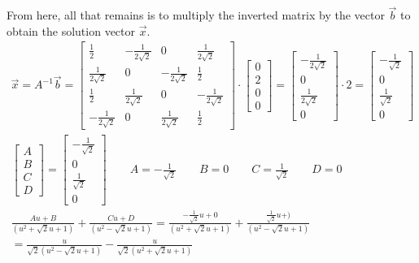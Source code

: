 \documentclass{article}
\theoremstyle{definition}
\begin{document}
From here, all that remains is to multiply the inverted matrix by the vector $\vec{b}$ to obtain
the solution vector $\vec{x}$.
\begin{equation*}
\begin{gathered}
\vec{x} = A^{-1}\vec{b} = \begin{bmatrix}
    \frac{1}{2} & -\frac{1}{2\sqrt{2}} & 0 & \frac{1}{2\sqrt{2}}\\
    \frac{1}{2\sqrt{2}} & 0 & -\frac{1}{2\sqrt{2}} & \frac{1}{2}\\
    \frac{1}{2} & \frac{1}{2\sqrt{2}} & 0 & -\frac{1}{2\sqrt{2}}\\
    -\frac{1}{2\sqrt{2}} & 0 & \frac{1}{2\sqrt{2}} & \frac{1}{2}
\end{bmatrix}\cdot \begin{bmatrix}
    0\\
    2\\
    0\\
    0
\end{bmatrix} = \begin{bmatrix}
    -\frac{1}{2\sqrt{2}}\\
    0\\
    \frac{1}{2\sqrt{2}}\\
    0
\end{bmatrix} \cdot 2 = \begin{bmatrix}
    -\frac{1}{\sqrt{2}}\\
    0\\
    \frac{1}{\sqrt{2}}\\
    0
\end{bmatrix}\\
\begin{bmatrix}
    A\\
    B\\
    C\\
    D
\end{bmatrix} = \begin{bmatrix}
    -\frac{1}{\sqrt{2}}\\
    0\\
    \frac{1}{\sqrt{2}}\\
    0
\end{bmatrix} \qquad A = -\frac{1}{\sqrt{2}} \qquad B = 0 \qquad C = \frac{1}{\sqrt{2}} %
\qquad D = 0\\
\frac{Au+B}{(u^2+\sqrt{2}u+1)} + \frac{Cu+D}{(u^2-\sqrt{2}u+1)} = %
\frac{-\frac{1}{\sqrt{2}}u+0}{(u^2+\sqrt{2}u+1)}
+ \frac{\frac{1}{\sqrt{2}}u+)}{(u^2-\sqrt{2}u+1)}\\
=\boxed{\frac{u}{\sqrt{2}(u^2-\sqrt{2}u+1)} - \frac{u}{\sqrt{2}(u^2+\sqrt{2}u+1)}}
\end{gathered}
\end{equation*}
\end{document}
